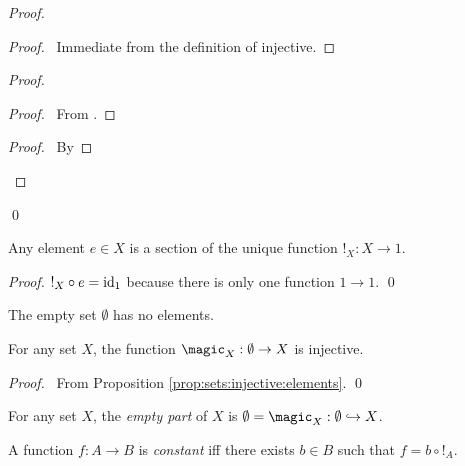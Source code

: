 \begin{proof}
  \pf
  \begin{proof}
    \pf\ Immediate from the definition of injective.
  \end{proof}
  \begin{proof}
    \begin{proof}
      \pf\ From .
    \end{proof}
    \begin{proof}
      \pf\ By 
    \end{proof}
  \end{proof}
  \qed
\end{proof}

\begin{prop}
  Any element $e \in X$ is a section of the unique function $!_X : X \rightarrow 1$.
\end{prop}

\begin{proof}
  \pf
  $!_X \circ e = \mathrm{id}_{1}$ because there is only one function $1 \rightarrow 1$.
  \qed
\end{proof}

\begin{ax}
 The empty set $\emptyset$ has no elements.
\end{ax}

\begin{prop}
  For any set $X$, the function $\magic_X : \emptyset \rightarrow X$ is injective.
\end{prop}

\begin{proof}
  \pf\ From Proposition \ref{prop:sets:injective:elements}. \qed
\end{proof}

\begin{df}
  For any set $X$, the \emph{empty part} of $X$ is $\emptyset = \magic_X : \emptyset \hookrightarrow X$.
\end{df}

  \begin{df}
  A function $f : A \rightarrow B$ is \emph{constant} iff there exists $b \in
  B$ such that $f = b \circ !_A$.
\end{df}

